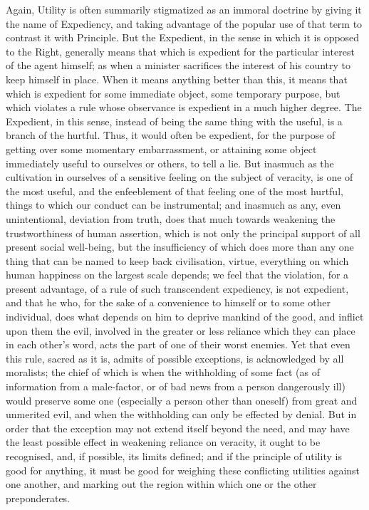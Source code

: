 Again, Utility is often summarily stigmatized as an immoral doctrine
by giving it the name of Expediency, and taking advantage of the
popular use of that term to contrast it with Principle. But the
Expedient, in the sense in which it is opposed to the Right, generally
means that which is expedient for the particular interest of the agent
himself; as when a minister sacrifices the interest of his country to
keep himself  in place. When it means anything better than
this, it means that which is expedient for some immediate object, some
temporary purpose, but which violates a rule whose observance is
expedient in a much higher degree. The Expedient, in this sense,
instead of being the same thing with the useful, is a branch of the
hurtful. Thus, it would often be expedient, for the purpose of getting
over some momentary embarrassment, or attaining some object
immediately useful to ourselves or others, to tell a lie. But inasmuch
as the cultivation in ourselves of a sensitive feeling on the subject
of veracity, is one of the most useful, and the enfeeblement of that
feeling one of the most hurtful, things to which our conduct can be
instrumental; and inasmuch as any, even unintentional, deviation from
truth, does that much towards weakening the trustworthiness of human
assertion, which is not only the principal support of all present
social well-being, but the insufficiency of which does more than any
one thing that can be named to keep back civilisation, virtue,
everything on which human happiness on the largest scale depends; we
feel that the violation, for a present advantage, of a rule of such
transcendent expediency, is not expedient, and that he who, for the
sake of a convenience to himself or to some other individual, does
what depends on him to deprive mankind of the good, and inflict upon
them the evil, involved in the greater or less reliance which they can
place in each other's word, acts the part of one of their worst
enemies. Yet that even this rule, sacred as it is, admits of possible
exceptions, is acknowledged by all moralists; the chief of which is
when the withholding of some fact (as of information from a
male-factor, or of bad news from a person dangerously ill)
would preserve some one (especially a person other than oneself) from
great and unmerited evil, and when the withholding can only be
effected by denial. But in order that the exception may not extend
itself beyond the need, and may have the least possible effect in
weakening reliance on veracity, it ought to be recognised, and, if
possible, its limits defined; and if the principle of utility is good
for anything, it must be good for weighing these conflicting utilities
against one another, and marking out the region within which one or
the other preponderates.

